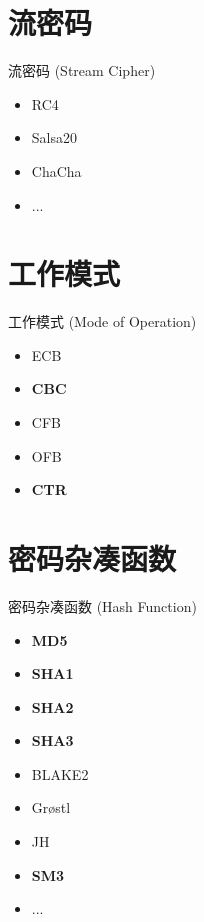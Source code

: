 \documentclass[xcolor=svgnames,handout]{beamer}
\begin{document}
\section{流密码}
\begin{frame}
	{流密码 (Stream Cipher)}
	\begin{itemize}
		\item RC4
		\item Salsa20
		\item ChaCha
		\item ...
	\end{itemize}
\end{frame}

\section{工作模式}
\begin{frame}
	{工作模式 (Mode of Operation)}
	\begin{itemize}
		\item ECB
		\item \begin{alertenv}\textbf{CBC}\end{alertenv}
		\item CFB
		\item OFB
		\item \begin{alertenv}\textbf{CTR}\end{alertenv}
	\end{itemize}
\end{frame}

\section{密码杂凑函数}
\begin{frame}
	{密码杂凑函数 (Hash Function)}
	\begin{itemize}
		\item \begin{alertenv}\textbf{MD5}\end{alertenv}
		\item \begin{alertenv}\textbf{SHA1}\end{alertenv}
		\item \begin{alertenv}\textbf{SHA2}\end{alertenv}
		\item \begin{alertenv}\textbf{SHA3}\end{alertenv}
		\item BLAKE2
		\item Gr{\o}stl
		\item JH
		\item \begin{alertenv}\textbf{SM3}\end{alertenv}
		\item ...
	\end{itemize}
\end{frame}
\end{document}
